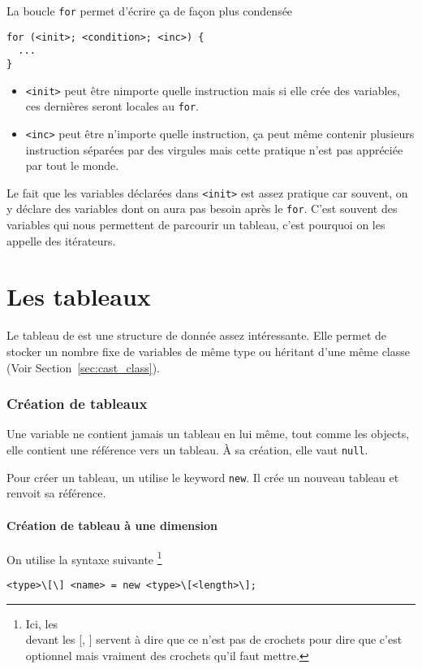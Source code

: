 La boucle \verb|for| permet d'écrire ça de façon plus condensée
\begin{lstlisting}
for (<init>; <condition>; <inc>) {
  ...
}
\end{lstlisting}

\begin{itemize}
  \item \verb|<init>| peut être nimporte quelle instruction mais si elle crée
    des variables, ces dernières seront locales au \verb|for|.
  \item \verb|<inc>| peut être n'importe quelle instruction, ça peut même
    contenir plusieurs instruction séparées par des virgules mais cette
    pratique n'est pas appréciée par tout le monde.
\end{itemize}
Le fait que les variables déclarées dans \verb|<init>| est assez pratique car
souvent, on y déclare des variables dont on aura pas besoin après le \verb|for|.
C'est souvent des variables qui nous permettent de parcourir un tableau,
c'est pourquoi on les appelle des itérateurs.

\part{Les tableaux}
Le tableau de \java{} est une structure de donnée assez intéressante.
Elle permet de stocker un nombre fixe de variables de même type
ou héritant d'une même classe (Voir Section~\ref{sec:cast_class}).

\section{Création de tableaux}
Une variable ne contient jamais un tableau en lui même,
tout comme les objects, elle contient une référence vers un tableau.
À sa création, elle vaut \verb|null|.

Pour créer un tableau, un utilise le keyword \verb|new|.
Il crée un nouveau tableau et renvoit sa référence.

\subsection{Création de tableau à une dimension}
On utilise la syntaxe suivante
\footnote{Ici, les \\ devant les [, ] servent à dire que ce n'est
pas de crochets pour dire que c'est optionnel mais vraiment des
crochets qu'il faut mettre.}
\begin{lstlisting}
<type>\[\] <name> = new <type>\[<length>\];
\end{lstlisting}

